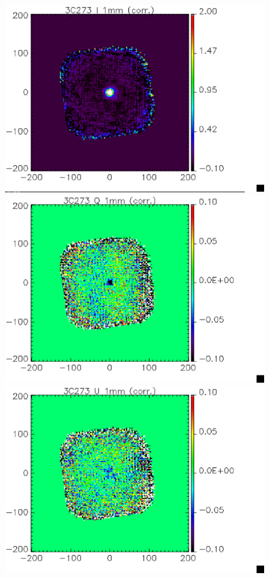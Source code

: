 \documentclass[a4paper,10pt]{article}
\begin{document}
\begin{figure}
\begin{center}
\includegraphics[clip, angle=0, scale = 0.3]{figures/I_3C273_1mm_corr.eps}
\includegraphics[clip, angle=0, scale = 0.3]{figures/Q_3C273_1mm_corr.eps}
\includegraphics[clip, angle=0, scale = 0.3]{figures/U_3C273_1mm_corr.eps}

\end{center}
\end{figure}
\end{document}
